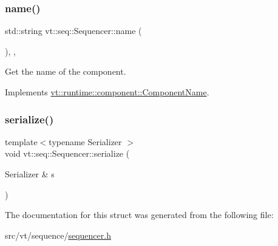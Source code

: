 \subsubsection{\texorpdfstring{name()}{name()}}
{\footnotesize\ttfamily std\+::string vt\+::seq\+::\+Sequencer\+::name (\begin{DoxyParamCaption}{ }\end{DoxyParamCaption})\hspace{0.3cm}{\ttfamily [inline]}, {\ttfamily [override]}, {\ttfamily [virtual]}}



Get the name of the component. 



Implements \hyperlink{structvt_1_1runtime_1_1component_1_1_component_name_a33c06229bb605a2b2ceff68830d6d773}{vt\+::runtime\+::component\+::\+Component\+Name}.

\mbox{\label{structvt_1_1seq_1_1_sequencer_a577f04952123547c3d8c8b3d28cf19ef}} 
\subsubsection{\texorpdfstring{serialize()}{serialize()}}
{\footnotesize\ttfamily template$<$typename Serializer $>$ \\
void vt\+::seq\+::\+Sequencer\+::serialize (\begin{DoxyParamCaption}\item[{Serializer \&}]{s }\end{DoxyParamCaption})\hspace{0.3cm}{\ttfamily [inline]}}



The documentation for this struct was generated from the following file\+:\begin{DoxyCompactItemize}
\item 
src/vt/sequence/\hyperlink{sequencer_8h}{sequencer.\+h}\end{DoxyCompactItemize}
